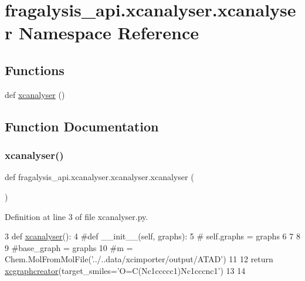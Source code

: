 \hypertarget{namespacefragalysis__api_1_1xcanalyser_1_1xcanalyser}{}\section{fragalysis\+\_\+api.\+xcanalyser.\+xcanalyser Namespace Reference}
\label{namespacefragalysis__api_1_1xcanalyser_1_1xcanalyser}
\subsection*{Functions}
\begin{DoxyCompactItemize}
\item 
def \hyperlink{namespacefragalysis__api_1_1xcanalyser_1_1xcanalyser_adfbf08eea9d2b8bad903f4291a557ac6}{xcanalyser} ()
\end{DoxyCompactItemize}


\subsection{Function Documentation}
\mbox{\label{namespacefragalysis__api_1_1xcanalyser_1_1xcanalyser_adfbf08eea9d2b8bad903f4291a557ac6}} 
\subsubsection{\texorpdfstring{xcanalyser()}{xcanalyser()}}
{\footnotesize\ttfamily def fragalysis\+\_\+api.\+xcanalyser.\+xcanalyser.\+xcanalyser (\begin{DoxyParamCaption}{ }\end{DoxyParamCaption})}



Definition at line 3 of file xcanalyser.\+py.


\begin{DoxyCode}
3 \textcolor{keyword}{def }\hyperlink{namespacefragalysis__api_1_1xcanalyser_1_1xcanalyser_adfbf08eea9d2b8bad903f4291a557ac6}{xcanalyser}():
4     \textcolor{comment}{#def \_\_init\_\_(self, graphs):        }
5     \textcolor{comment}{#    self.graphs = graphs}
6         
7     
8 
9     \textcolor{comment}{#base\_graph = graphs}
10     \textcolor{comment}{#m = Chem.MolFromMolFile('../..data/xcimporter/output/ATAD')}
11 
12     \textcolor{keywordflow}{return} \hyperlink{namespacefragalysis__api_1_1xcanalyser_1_1graphcreator_a028827844f85500b1fab4ff79cc7718c}{xcgraphcreator}(target\_smiles=\textcolor{stringliteral}{'O=C(Nc1ccccc1)Nc1cccnc1'})
13 
14 
\end{DoxyCode}
